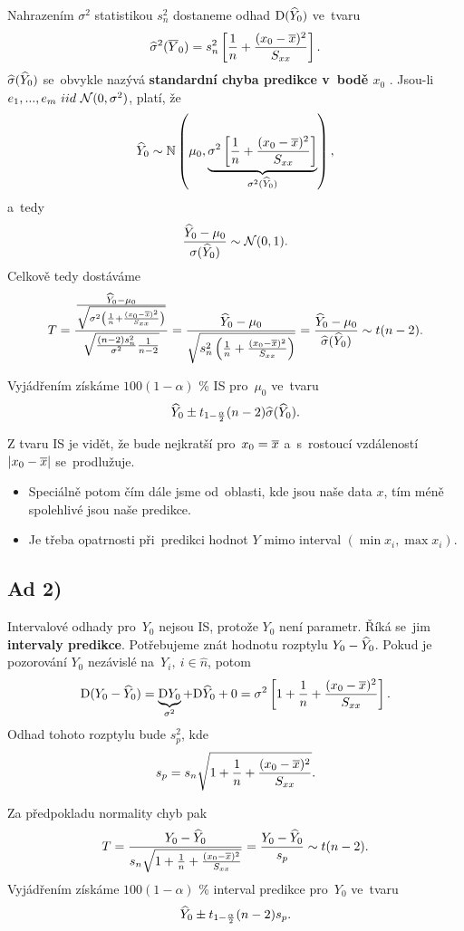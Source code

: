 	Nahrazením $\sigma^2$ statistikou $s_n^2$ dostaneme odhad $\mathrm{D}(\widehat{Y}_0)$ ve~tvaru
	 $$ \widehat{\sigma}^2(\overline{Y}_0) = s_n^2\left[\frac{1}{n}+\frac{(x_0-\overline{x})^2}{S_{xx}} \right]. $$
	 $\widehat{\sigma}(\widehat{Y}_0)$ se~obvykle nazývá \textbf{standardní chyba predikce v~bodě $x_0$ }. Jsou-li $e_1,...,e_m~iid~\mathcal{N}(0,\sigma^2)$, platí, že
	 $$ \widehat{Y}_0\sim\mathbb{N}\left(\mu_0,\underbrace{\sigma^2\left[\frac{1}{n} + \frac{(x_0-\overline{x})^2}{S_{xx}} \right]}_{\sigma^2(\widehat{Y}_0)} \right), $$a~tedy
	 $$ \frac{\widehat{Y}_0-\mu_0}{\sigma(\widehat{Y}_0)}\sim\mathcal{N}(0,1). $$
	Celkově tedy dostáváme
	 $$ T = \frac{\frac{\widehat{Y}_0-\mu_0}{\sqrt{\sigma^2\left(\frac{1}{n}+\frac{(x_0-\overline{x})^2}{S_{xx}}\right)}}}{\sqrt{\frac{(n-2)s_n^2}{\sigma^2}\frac{1}{n-2}}} = \frac{\widehat{Y}_0-\mu_0}{\sqrt{s_n^2\left(\frac{1}{n}+\frac{(x_0-\overline{x})^2}{S_{xx}} \right)}} = \frac{\widehat{Y}_0-\mu_0}{\widehat{\sigma}(\widehat{Y}_0)}\sim t(n-2). $$
	
	Vyjádřením získáme $100(1-\alpha)$ \% IS pro~$\mu_0$ ve~tvaru $$ \widehat{Y}_0\pm t_{1-\frac{\alpha}{2}}(n-2)\widehat{\sigma}(\widehat{Y}_0). $$
	\begin{remark}
		Z tvaru IS je vidět, že bude nejkratší pro~$x_0 = \overline{x}$ a~s~rostoucí vzdáleností $| x_0-\overline{x} |$ se~prodlužuje.\begin{itemize}
			\item  Speciálně potom čím dále jsme od~oblasti, kde jsou naše data $x$, tím méně spolehlivé jsou naše predikce.
			\item Je třeba opatrnosti při~predikci hodnot $Y$ mimo interval $(\min x_i,\max x_i)$.
		\end{itemize}
\end{remark}

\subsection*{Ad 2)}
Intervalové odhady pro~$Y_0$ nejsou IS, protože $Y_0$ není parametr. Říká se~jim \textbf{intervaly predikce}. Potřebujeme znát hodnotu rozptylu $Y_0-\widehat{Y}_0$. Pokud je pozorování $Y_0$ nezávislé na~$Y_i,~i\in\widehat{n}$, potom
 $$ \mathrm{D}(Y_0-\widehat{Y}_0) = \underbrace{\mathrm{D} Y_0}_{\sigma^2}+\mathrm{D} \widehat{Y}_0+0 = \sigma^2\left[1+\frac{1}{n}+\frac{(x_0-\overline{x})^2}{S_{xx}} \right]. $$ Odhad tohoto rozptylu bude $s_p^2$, kde
 $$ s_p = s_n\sqrt{1+\frac{1}{n}+\frac{(x_0-\overline{x})^2}{S_{xx}}}. $$

Za předpokladu normality chyb pak
 $$ T = \frac{Y_0-\widehat{Y}_0}{s_n\sqrt{1+\frac{1}{n}+\frac{(x_0-\overline{x})^2}{S_{xx}}}} = \frac{Y_0-\widehat{Y}_0}{s_p}\sim t(n-2). $$
Vyjádřením získáme $100(1-\alpha)$ \% interval predikce pro~$Y_0$ ve~tvaru
 $$ \widehat{Y}_0 \pm t_{1-\frac{\alpha}{2}}(n-2)s_p. $$

